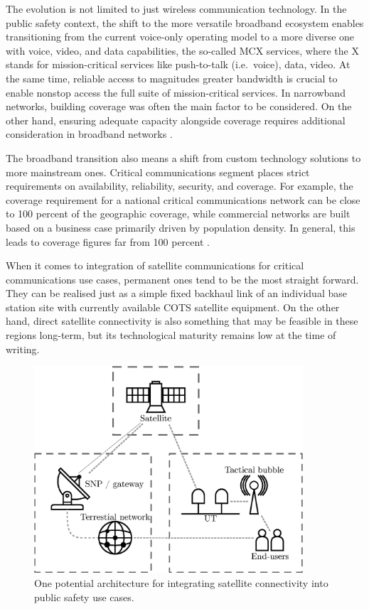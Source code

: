 \documentclass[english, 12pt, a4paper, elec, utf8, a-1b, online]{aaltothesis}
\begin{document}
The evolution is not limited to just wireless communication technology. In the public safety context, the shift to the more versatile broadband ecosystem enables transitioning from the current voice-only operating model to a more diverse one with voice, video, and data capabilities, the so-called MCX services, where the X stands for mission-critical services like push-to-talk (i.e.\ voice), data, video.
At the same time, reliable access to magnitudes greater bandwidth is crucial to enable nonstop access the full suite of mission-critical services.
In narrowband networks, building coverage was often the main factor to be considered.
On the other hand, ensuring adequate capacity alongside coverage requires additional consideration in broadband networks \cite{saynevirta2021satellite}.

The broadband transition also means a shift from custom technology solutions to more mainstream ones. Critical communications segment places strict requirements on availability, reliability, security, and coverage. For example, the coverage requirement for a national critical communications network can be close to 100 percent of the geographic coverage, while commercial networks are built based on a business case primarily driven by population density. In general, this leads to coverage figures far from 100 percent \cite{saynevirta2021satellite}.

When it comes to integration of satellite communications for critical communications use cases, permanent ones tend to be the most straight forward. They can be realised just as a simple fixed backhaul link of an individual base station site with currently available COTS satellite equipment.
On the other hand, direct satellite connectivity is also something that may be feasible in these regions long-term, but its technological maturity remains low at the time of writing.

\begin{figure}[h]
  \centering
  \includegraphics[width=100mm]{figures/fig-satcom-in-ps.eps}
  \caption{One potential architecture for integrating satellite connectivity into public safety use cases.}
  \label{fig-satcom-in-ps}
\end{figure}
\end{document}
